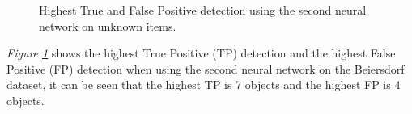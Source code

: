 \begin{figure}[h]
 \centering
 \hfill
 
 \caption{Highest True and False Positive detection using the second neural network on unknown items.}
 \label{fig:v2max}
\end{figure}

\textit{Figure \ref{fig:v2max}} shows the highest True Positive (TP) detection and the highest False Positive (FP) detection when using the second neural network on the Beiersdorf dataset, it can be seen that the highest TP is 7 objects and the highest FP is 4 objects.

\clearpage
